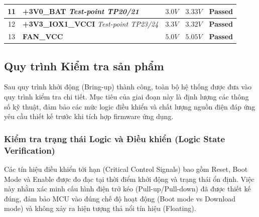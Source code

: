 \begin{longtable}{|c|p{}|p{}|p{}|c|}
                11 & \textbf{+3V0\_BAT} \newline \textit{Test-point TP20/21} & $3.0 V$ & $3.33 V$ & \textcolor{modern_blue}{\textbf{Passed}} \\ \hline
                
                12 & \textbf{+3V3\_IOX1\_VCCI} \newline \textit{Test-point TP23/24} & $3.3 V$ & $3.32 V$ & \textcolor{modern_blue}{\textbf{Passed}} \\ \hline
                
                13 & \textbf{FAN\_VCC} & $5.0 V$ & $5.05 V$ & \textcolor{modern_blue}{\textbf{Passed}} \\ \hline

            \end{longtable}

        \subsection{Quy trình Kiểm tra sản phẩm}

            Sau quy trình khởi động (Bring-up) thành công, toàn bộ hệ thống được đưa vào quy trình kiểm tra chi tiết. Mục tiêu của giai đoạn này là định lượng các thông số kỹ thuật, đảm bảo các mức logic điều khiển và chất lượng nguồn điện đáp ứng yêu cầu thiết kế trước khi tích hợp firmware ứng dụng.
        
            \subsubsection{Kiểm tra trạng thái Logic và Điều khiển (Logic State Verification)}
                Các tín hiệu điều khiển tới hạn (Critical Control Signals) bao gồm Reset, Boot Mode và Enable được đo đạc tại thời điểm khởi động và trạng thái ổn định. Việc này nhằm xác minh cấu hình điện trở kéo (Pull-up/Pull-down) đã được thiết kế đúng, đảm bảo MCU vào đúng chế độ hoạt động (Boot mode vs Download mode) và không xảy ra hiện tượng thả nổi tín hiệu (Floating).
        
